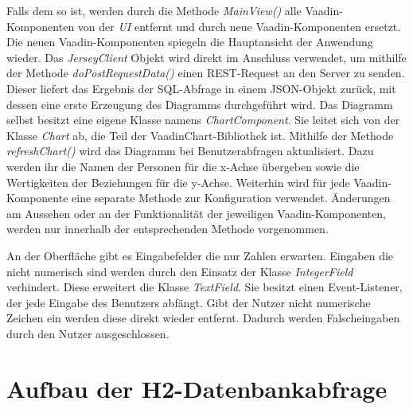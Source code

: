 Falls dem so ist, werden durch die Methode \textit{MainView()} alle Vaadin-Komponenten von der \textit{UI} entfernt und durch neue Vaadin-Komponenten ersetzt. Die neuen Vaadin-Komponenten spiegeln die Hauptansicht der Anwendung wieder. Das \textit{JerseyClient} Objekt wird direkt im Anschluss verwendet, um mithilfe der Methode \textit{doPostRequestData()} einen REST-Request an den Server zu senden. Dieser liefert das Ergebnis der SQL-Abfrage in einem JSON-Objekt zurück, mit dessen eine erste Erzeugung des Diagramms durchgeführt wird. Das Diagramm selbst besitzt eine eigene Klasse namens \textit{ChartComponent}. Sie leitet sich von der Klasse \textit{Chart} ab, die Teil der VaadinChart-Bibliothek ist. Mithilfe der Methode \textit{refreshChart()} wird das Diagramm bei Benutzerabfragen aktualisiert. Dazu werden ihr die Namen der Personen für die x-Achse übergeben sowie die Wertigkeiten der Beziehungen für die y-Achse. Weiterhin wird für jede Vaadin-Komponente eine separate Methode zur Konfiguration verwendet. Änderungen am Aussehen oder an der Funktionalität der jeweiligen Vaadin-Komponenten, werden nur innerhalb der entsprechenden Methode vorgenommen.

An der Oberfläche gibt es Eingabefelder die nur Zahlen erwarten. Eingaben die nicht numerisch sind werden durch den Einsatz der Klasse \textit{IntegerField} verhindert. Diese erweitert die Klasse \textit{TextField}. Sie besitzt einen Event-Listener, der jede Eingabe des Benutzers abfängt. Gibt der Nutzer nicht numerische Zeichen ein werden diese direkt wieder entfernt. Dadurch werden Falscheingaben durch den Nutzer ausgeschlossen.

\section{Aufbau der H2-Datenbankabfrage}

